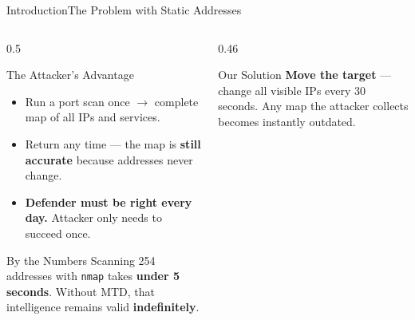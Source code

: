 \documentclass[aspectratio=169,10pt]{beamer}
\begin{document}
\begin{frame}{Introduction}{The Problem with Static Addresses}
  \begin{columns}[T]
    \begin{column}{0.5\textwidth}
      \begin{block}{The Attacker's Advantage}
        \begin{itemize}\small\setlength\itemsep{5pt}
          \item Run a port scan once $\rightarrow$ complete map of all IPs and services.
          \item Return any time --- the map is \textbf{still accurate} because addresses never change.
          \item \textbf{Defender must be right every day.} Attacker only needs to succeed once.
        \end{itemize}
      \end{block}
      \vspace{0.25cm}
      \begin{alertblock}{By the Numbers}
        \small Scanning 254 addresses with \texttt{nmap} takes \textbf{under 5 seconds}. Without MTD, that intelligence remains valid \textbf{indefinitely}.
      \end{alertblock}
    \end{column}
    \begin{column}{0.46\textwidth}
      \vspace{0.15cm}
      \vspace{0.3cm}
      \begin{exampleblock}{Our Solution}
        \centering\small
        \textbf{Move the target} --- change all visible IPs every 30 seconds. Any map the attacker collects becomes instantly outdated.
      \end{exampleblock}
    \end{column}
  \end{columns}
\end{frame}
\end{document}

